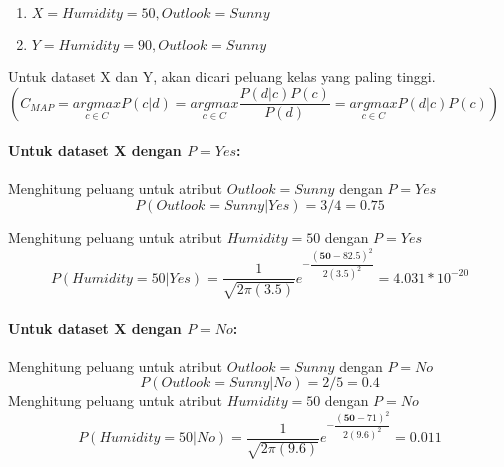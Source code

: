 \begin{enumerate}
	\item $X = {Humidity = 50, Outlook = Sunny}$
	\item $Y = {Humidity = 90, Outlook = Sunny}$
\end{enumerate}
		
Untuk dataset X dan Y, akan dicari peluang kelas yang paling tinggi. \\
		
$( C_{MAP} = \underset{c \in C}{ argmax } P(c|d) = \underset{c \in C}{ argmax } \dfrac{P(d|c) P(c)}{P(d)} = \underset{c \in C}{ argmax } P(d|c) P(c) )$
		
\paragraph{Untuk dataset X dengan $P=Yes$:}
	Menghitung peluang untuk atribut $Outlook=Sunny$ dengan $P=Yes$
	\begin{equation}
			P(Outlook=Sunny|Yes) = 3/4 
			= 0.75
	\end{equation}
	
	Menghitung peluang untuk atribut $Humidity=50$ dengan $P=Yes$
		\begin{equation}
			P(Humidity=50|Yes) 
			= \dfrac{1}{\sqrt{2\pi(3.5)}}e^{-\dfrac{(\textbf{50}-82.5)^2}{2(3.5)^2}}
			= 4.031*10^{-20}
		\end{equation}
	
	\paragraph{Untuk dataset X dengan $P=No$:}
		Menghitung peluang untuk atribut $Outlook=Sunny$ dengan $P=No$
		\begin{equation}
			P(Outlook=Sunny|No) = 2/5 
			= 0.4
		\end{equation}
		Menghitung peluang untuk atribut $Humidity=50$ dengan $P=No$
		\begin{equation}
			P(Humidity=50|No) 
			= \dfrac{1}{\sqrt{2\pi(9.6)}}e^{-\dfrac{(\textbf{50}-71)^2}{2(9.6)^2}}
			= 0.011
		\end{equation}
